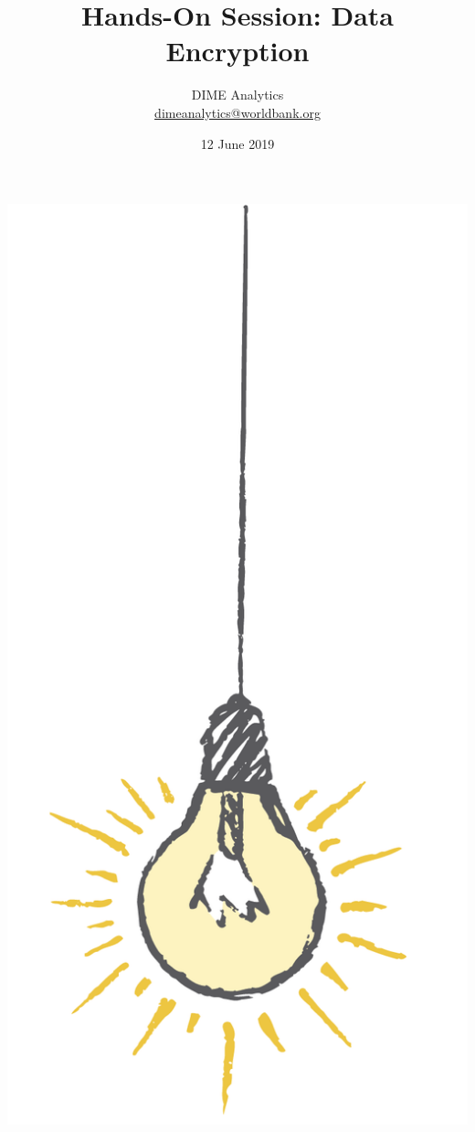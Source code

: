 \documentclass{tufte-handout}
\title{Hands-On Session: Data Encryption}
\author{DIME Analytics \\ \href{mailto:dimeanalytics@worldbank.org}{dimeanalytics@worldbank.org}}
\date{12 June 2019}  %
\begin{document}
\maketitle%

\begin{marginfigure}%
  \includegraphics[width=\linewidth]{img/light.png}
\end{marginfigure}
\end{document}
